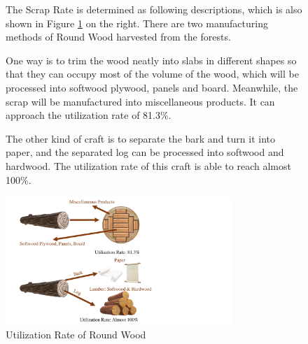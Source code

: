 \documentclass{mcmthesis}
\numberwithin{figure}{section}
\numberwithin{table}{section}
\numberwithin{equation}{section}
\begin{document}
\begin{figure}[ht]
  \begin{minipage}[htbp]{0.42\linewidth}
    The Scrap Rate is determined as following descriptions, which is also shown 
    in Figure \ref{RoundWood} on the right. There are two 
    manufacturing methods of Round Wood harvested from the forests. 
    \par
    One way is to trim the wood neatly into slabs in different shapes so that they can
    occupy most of the volume of the wood, which will be processed into softwood plywood, 
    panels and board. Meanwhile, the scrap will be manufactured into miscellaneous 
    products. It can approach the utilization rate of 81.3\%.
    \par
    The other kind of craft is to separate the bark and turn it into paper, and 
    the separated log can be processed into softwood and hardwood. The utilization 
    rate of this craft is able to reach almost 100\%.
  \end{minipage}
  \hfill
  \begin{minipage}[htbp]{0.5\linewidth}
    \begin{flushright}
      \includegraphics[width = 8.61cm]{code&pic/Roundwood cutting ways.pdf}
      \caption{Utilization Rate of Round Wood}\label{RoundWood}
    \end{flushright}
  \end{minipage}
\end{figure}
\end{document}
